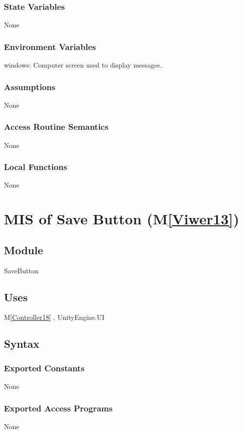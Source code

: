 \documentclass[12pt, titlepage]{article}
\newcommand{\mref}[1]{M\ref{#1}}
\begin{document}
\subsubsection{State Variables}
None
\subsubsection{Environment Variables}
windows: Computer screen used to display messages.
\subsubsection{Assumptions}
None
\subsubsection{Access Routine Semantics}
None
\subsubsection{Local Functions}
None


\newpage

\section{MIS of Save Button (\mref{Viwer13})}

\subsection{Module}
SaveButton

\subsection{Uses}
\mref{Controller18}  , UnityEngine.UI

\subsection{Syntax}
\subsubsection{Exported Constants}
None
\subsubsection{Exported Access Programs}
None
\end{document}
